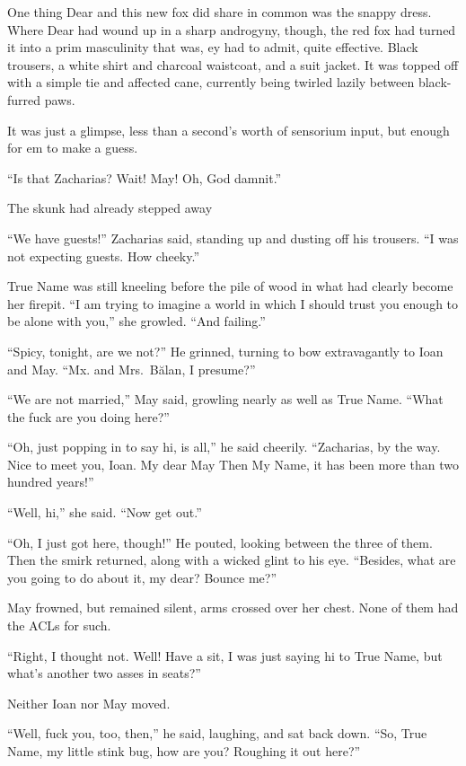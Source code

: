 One thing Dear and this new fox did share in common was the snappy dress. Where Dear had wound up in a sharp androgyny, though, the red fox had turned it into a prim masculinity that was, ey had to admit, quite effective. Black trousers, a white shirt and charcoal waistcoat, and a suit jacket. It was topped off with a simple tie and affected cane, currently being twirled lazily between black-furred paws.

It was just a glimpse, less than a second's worth of sensorium input, but enough for em to make a guess.

``Is that Zacharias? Wait! May! Oh, God damnit.''

The skunk had already stepped away

``We have guests!'' Zacharias said, standing up and dusting off his trousers. ``I was not expecting guests. How cheeky.''

True Name was still kneeling before the pile of wood in what had clearly become her firepit. ``I am trying to imagine a world in which I should trust you enough to be alone with you,'' she growled. ``And failing.''

``Spicy, tonight, are we not?'' He grinned, turning to bow extravagantly to Ioan and May. ``Mx. and Mrs.~Bălan, I presume?''

``We are not married,'' May said, growling nearly as well as True Name. ``What the fuck are you doing here?''

``Oh, just popping in to say hi, is all,'' he said cheerily. ``Zacharias, by the way. Nice to meet you, Ioan. My dear May Then My Name, it has been more than two hundred years!''

``Well, hi,'' she said. ``Now get out.''

``Oh, I just got here, though!'' He pouted, looking between the three of them. Then the smirk returned, along with a wicked glint to his eye. ``Besides, what are you going to do about it, my dear? Bounce me?''

May frowned, but remained silent, arms crossed over her chest. None of them had the ACLs for such.

``Right, I thought not. Well! Have a sit, I was just saying hi to True Name, but what's another two asses in seats?''

Neither Ioan nor May moved.

``Well, fuck you, too, then,'' he said, laughing, and sat back down. ``So, True Name, my little stink bug, how are you? Roughing it out here?''

